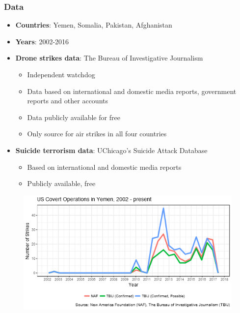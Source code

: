 \documentclass{beamer}
\begin{document}
  \begin{frame}
    \frametitle{Data}
    \begin{itemize}
	\item \textbf{Countries}: Yemen, Somalia, Pakistan, Afghanistan
	\item \textbf{Years}: 2002-2016
	\item \textbf{Drone strikes data}: The Bureau of Investigative Journalism
		\begin{itemize}
			\item Independent watchdog
			\item Data based on international and domestic media reports, government reports and other accounts
			\item Data publicly available for free
			\item Only source for air strikes in all four countries
		\end{itemize}
	\item \textbf{Suicide terrorism data}: UChicago's Suicide Attack Database
		\begin{itemize}
			\item Based on international and domestic media reports
			\item Publicly available, free
		\end{itemize}
     \end{itemize}
  \end{frame}

  \begin{frame}
	\begin{figure}[h!]
		\includegraphics[width=\linewidth]{yemen_strikes.png}
	\end{figure}
  \end{frame}
\end{document}
